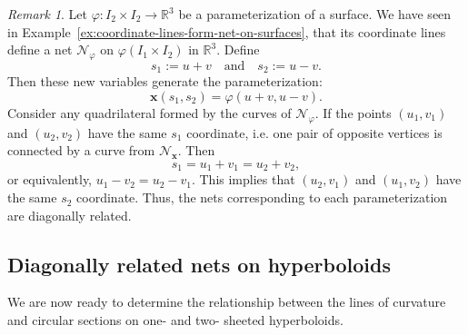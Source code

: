 \documentclass[10pt, a4paper]{article}
\theoremstyle{BoldTopSpacing}
\theoremstyle{BoldTopSpacing}
\theoremstyle{BoldTopSpacing}
\theoremstyle{BoldTopBottomSpacing}
\theoremstyle{BoldTopSpacing}
\theoremstyle{BoldTopBottomSpacing}
\theoremstyle{remark}
\newtheorem{remark}{\textit{Remark}}[section]
\begin{document}
\begin{remark}
\label{rm:plusminus}
Let $\varphi : I_{2} \times I_{2} \to \mathbb{R}^3$ be a parameterization of a surface. We have seen in Example~\ref{ex:coordinate-lines-form-net-on-surfaces}, that its coordinate lines define a net $\mathcal{N}_{\varphi}$ on $\varphi(I_{1} \times I_{2})$ in $\mathbb{R}^3$. Define
\[
    s_{1} := u + v \quad \text{and} \quad s_{2} := u - v.
\]
Then these new variables generate the parameterization:
\[
    \boldsymbol{x}(s_{1}, s_{2}) = \varphi\left(u + v, u - v \right).
\]
Consider any quadrilateral formed by the curves of $\mathcal{N}_{\varphi}$. If the points $(u_{1}, v_{1})$ and $(u_{2}, v_{2})$ have the same $s_{1}$ coordinate, i.e. one pair of opposite vertices is connected by a curve from $\mathcal{N}_{\boldsymbol{x}}$. Then
\[
    s_{1} = u_{1} + v_{1} = u_{2} + v_{2},
\]
or equivalently, $u_{1} - v_{2} = u_{2} - v_{1}$. This implies that $(u_{2}, v_{1})$ and $(u_{1}, v_{2})$ have the same $s_{2}$ coordinate. Thus, the nets corresponding to each parameterization are diagonally related.
\end{remark}

\subsection{Diagonally related nets on hyperboloids}
We are now ready to determine the relationship between the lines of curvature and circular sections on one- and two- sheeted hyperboloids.
\end{document}

